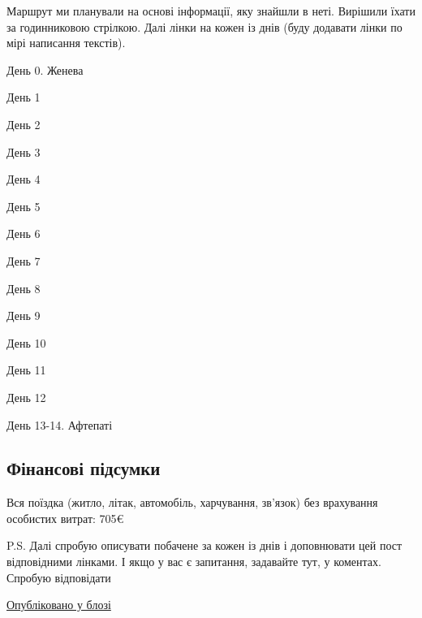 Маршрут ми планували на основі інформації, яку знайшли в неті. Вирішили
їхати за годинниковою стрілкою. Далі лінки на кожен із днів (буду
додавати лінки по мірі написання текстів).

День 0. Женева

День 1

День 2

День 3

День 4

День 5

День 6

День 7

День 8

День 9

День 10

День 11

День 12

День 13-14. Афтепаті

\subsection{Фінансові підсумки}

Вся поїздка (житло, літак, автомобіль, харчування, зв'язок) без
врахування особистих витрат: 705\euro{}

P.S. Далі спробую описувати побачене за кожен із днів і доповнювати цей
пост відповідними лінками. І якщо у вас є запитання, задавайте тут, у
коментах. Спробую відповідати

\href{http://dyoma.pp.ua/2015/09/02/dichslandiya-12-dniv-v-krajini-vodospadiv-hejzeriv-vulkaniv-ta-inshyh-vydumok-pryrody/}{Опубліковано
у блозі}
